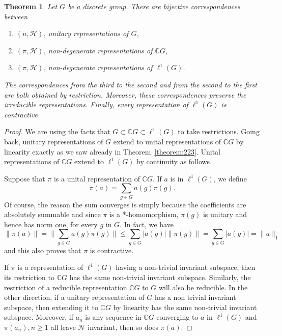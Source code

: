 \documentclass{book}
\newtheorem{theorem}[definition]{Theorem}
\begin{document}
\begin{theorem}\label{theorem:244}
  Let \(G\) be a discrete group. There are bijective correspondences between
  \begin{enumerate}
    \item \((u,\mathcal{H})\), unitary representations of \(G\),
    \item \((\pi,\mathcal{H})\), non-degenerate representations of \(\mathbb{C}G\),
    \item \((\pi,\mathcal{H})\), non-degenerate representations of \(\ell^1(G)\).
  \end{enumerate}
  The correspondences from the third to the second and from the second to the
  first are both obtained by restriction. Moreover, these correspondences preserve 
  the irreducible representations. Finally, every representation of \(\ell^1(G)\)
  is contractive.
\end{theorem}
\begin{proof}
  We are using the facts that \(G \subset \mathbb{C}G \subset \ell^1(G)\) to take restrictions.
  Going back, unitary representations of \(G\) extend to unital representations of
  \(\mathbb{C}G\) by linearity exactly as we saw already in Theorem~\ref{theorem:223}. Unital representations of
  \(\mathbb{C}G\) extend to \(\ell^1(G)\) by continuity as follows.\par
  Suppose that \(\pi\) is a unital representation of \(\mathbb{C}G\). If \(a\) is in \(\ell^1(G)\), we define
  \[
  \pi(a) =\sum_{g\in G}a(g)\pi(g).
  \]
  Of course, the reason the sum converges is simply because the coefficients
  are absolutely summable and since \(\pi\) is a *-homomorphism, \(\pi(g)\) is unitary
  and hence has norm one, for every \(g\) in \(G\). In fact, we have
  \[
  \|\pi(a)\| = \|\sum_{g\in G} a(g)\pi(g)\| \leq
  \sum_{g\in G}|a(g)| \|\pi(g)\| =
  \sum_{g\in G}|a(g)| = \|a\|_1
  \]
  and this also proves that \(\pi\) is contractive.\par
  If \(\pi\) is a representation of \(\ell^1(G)\) having a non-trivial invariant subspace,
  then its restriction to \(\mathbb{C}G\) has the same non-trivial invariant subspace. 
  Similarly, the restriction of a reducible representation \(\mathbb{C}G\) to \(G\) will also be
  reducible. In the other direction, if a unitary representation of \(G\) has a non
  trivial invariant subspace, then extending it to \(\mathbb{C}G\) by linearity has the same
  non-trivial invariant subspace. Moreover, if \(a_n\) is any sequence in \(\mathbb{C}G\) 
  converging to \(a\) in \(\ell^1(G)\) and \(\pi(a_n),n \geq 1\) all leave \(\mathcal{N}\) invariant, then so does
  \(\pi(a)\).
\end{proof}
\end{document}
